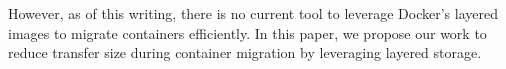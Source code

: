 However, as of this writing, there is no current tool to leverage Docker's layered images to migrate containers efficiently. In this paper, we propose our work to reduce transfer size during container migration by leveraging layered storage.
